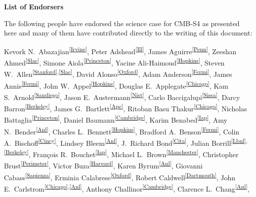 \begin{center}
  {\Large \bf List of Endorsers}
\end{center}
\bigskip


The following people have endorsed the science case for CMB-S4 as presented here and many of them have contributed directly to the writing of this document:



\begin{raggedright}

Kevork N.~Abazajian\textsuperscript{\ref{Irvine}},
Peter Adshead\textsuperscript{\ref{Ill}},
James Aguirre\textsuperscript{\ref{Penn}},
Zeeshan Ahmed\textsuperscript{\ref{Slac}},
Simone Aiola\textsuperscript{\ref{Princeton}},
Yacine Ali-Haimoud\textsuperscript{\ref{Hopkins}},
Steven W.~Allen\textsuperscript{\ref{Stanford},\ref{Slac}},
David Alonso\textsuperscript{\ref{Oxford}},
Adam Anderson\textsuperscript{\ref{Fermi}},
James Annis\textsuperscript{\ref{Fermi}},
John W.~Appel\textsuperscript{\ref{Hopkins}}, 
Douglas E.~Applegate\textsuperscript{\ref{Chicago}}, 
Kam S.~Arnold\textsuperscript{\ref{Sandiego}}, 
Jason E.~Austermann\textsuperscript{\ref{Nist}},
Carlo Baccigalupi\textsuperscript{\ref{Sissa}}, 
Darcy Barron\textsuperscript{\ref{Berkeley}}, 
James G.~Bartlett\textsuperscript{\ref{Apc}}, 
Ritoban Basu Thakur\textsuperscript{\ref{Chicago}},
Nicholas Battaglia\textsuperscript{\ref{Princeton}},
Daniel Baumann\textsuperscript{\ref{Cambridge}},
Karim Benabed\textsuperscript{\ref{Iap}}, 
Amy N.~Bender\textsuperscript{\ref{Anl}}, 
Charles L.~Bennett\textsuperscript{\ref{Hopkins}},
Bradford A.~Benson\textsuperscript{\ref{Fermi}},
Colin A.~Bischoff\textsuperscript{\ref{Cincy}},
Lindsey Bleem\textsuperscript{\ref{Anl}}, 
J.~Richard Bond\textsuperscript{\ref{Cita}}, 
Julian Borrill\textsuperscript{\ref{Lbnl},\ref{Berkeley}}, 
François R.~Bouchet\textsuperscript{\ref{Iap}}, 
Michael L.~Brown\textsuperscript{\ref{Manchester}},
Christopher Brust\textsuperscript{\ref{Perimeter}}, 
Victor Buza\textsuperscript{\ref{Harvard}}, 
Karen Byrum\textsuperscript{\ref{Anl}}, 
Giovanni Cabass\textsuperscript{\ref{Sapienza}}, 
Erminia Calabrese\textsuperscript{\ref{Oxford}}, 
Robert Caldwell\textsuperscript{\ref{Dartmouth}}, 
John E.~Carlstrom\textsuperscript{\ref{Chicago},\ref{Anl}}, 
Anthony Challinor\textsuperscript{\ref{Cambridge}}, 
Clarence L.~Chang\textsuperscript{\ref{Anl}}, 

\end{raggedright}

